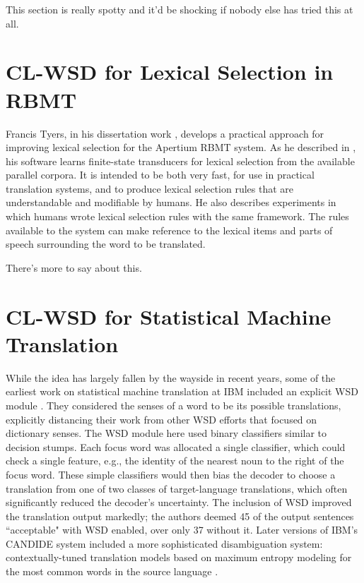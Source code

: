 This section is really spotty and it'd be shocking if nobody else has tried
this at all.

\section{CL-WSD for Lexical Selection in RBMT}
Francis Tyers, in his dissertation work \cite{tyers-dissertation}, develops a
practical approach for improving lexical selection for the Apertium RBMT
system. As he described in \cite{tyers-fst}, his software learns finite-state
transducers for lexical selection from the available parallel corpora.
It is intended to be both very fast, for use in practical translation systems,
and to produce lexical selection rules that are understandable and modifiable
by humans. He also describes experiments in which humans wrote lexical
selection rules with the same framework.
The rules available to the system can make reference to the lexical items and
parts of speech surrounding the word to be translated.

There's more to say about this.



\section{CL-WSD for Statistical Machine Translation}
While the idea has largely fallen by the wayside in recent years,
some of the earliest work on statistical machine translation at IBM included
an explicit WSD module \cite{Brown91word-sensedisambiguation}.
They considered the senses of a word to be its possible translations,
explicitly distancing their work from other WSD efforts that focused on
dictionary senses.
The WSD module here used binary classifiers similar to decision stumps. Each
focus word was allocated a single classifier, which could check a single
feature, e.g., the identity of the nearest noun to the right of the focus word.
These simple classifiers would then bias the decoder to choose a
translation from one of two classes of target-language translations,
which often significantly reduced the decoder's uncertainty. The inclusion of
WSD improved the translation output markedly; the authors deemed 45 of the
output sentences ``acceptable" with WSD enabled, over only 37 without it.
Later versions of IBM's CANDIDE system included a more sophisticated
disambiguation system: contextually-tuned translation models based on
maximum entropy modeling for the most common words in the source language
\cite{Berger:1994:CSM:1075812.1075844}.

